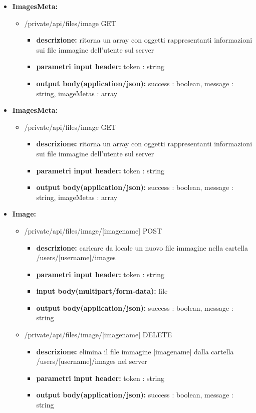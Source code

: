 {{\begin{itemize}
		\item \textbf{ImagesMeta:}
			\begin{itemize}
			\item   /private/api/files/image GET
				\begin{itemize} 
				\item \textbf{descrizione:} ritorna un array con oggetti rappresentanti informazioni sui file immagine dell'utente sul server
				\item \textbf{parametri input header:} token : string
				\item \textbf{output body(application/json):}  success : boolean, message : string, imageMetas : array
				\end{itemize}
			\end{itemize}
			
		\item \textbf{ImagesMeta:}
			\begin{itemize}
			\item   /private/api/files/image GET
				\begin{itemize} 
				\item \textbf{descrizione:} ritorna un array con oggetti rappresentanti informazioni sui file immagine dell'utente sul server
				\item \textbf{parametri input header:} token : string
				\item \textbf{output body(application/json):}  success : boolean, message : string, imageMetas : array
				\end{itemize}
			\end{itemize}
			
		\item \textbf{Image:}
			\begin{itemize}
			\item    /private/api/files/image/[imagename] POST
				\begin{itemize} 
				\item \textbf{descrizione:} caricare da locale un nuovo file immagine nella cartella /users/[username]/images					
				\item \textbf{parametri input header:} token : string
				\item \textbf{input body(multipart/form-data):} file   
				\item \textbf{output body(application/json):}  success : boolean, message : string
				\end{itemize}
			\item    /private/api/files/image/[imagename] DELETE
				\begin{itemize} 
				\item \textbf{descrizione:} elimina il file immagine [imagename] dalla cartella /users/[username]/images nel server				
				\item \textbf{parametri input header:} token : string
				\item \textbf{output body(application/json):}  success : boolean, message : string
				\end{itemize}
			\end{itemize}
			

\end{itemize}}}
